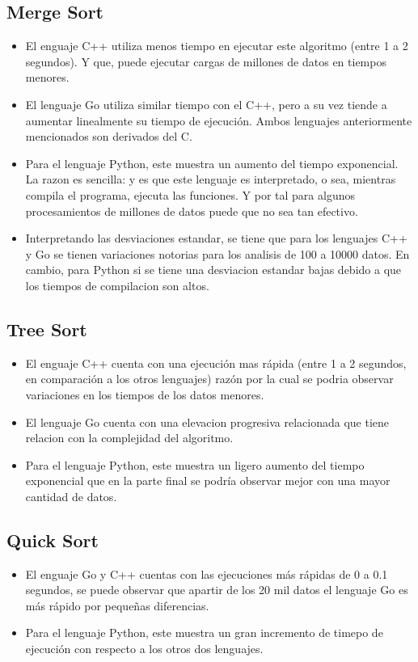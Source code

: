 \documentclass{article}
\begin{document}
    \subsection{Merge Sort} 
    \begin{itemize}
        \item El enguaje C++ utiliza menos tiempo en ejecutar este algoritmo (entre 1 a 2 segundos). Y que, puede ejecutar cargas de millones de datos en tiempos menores. 
        \item El lenguaje Go utiliza similar tiempo con el C++, pero a su vez tiende a aumentar linealmente su tiempo de ejecución. Ambos lenguajes anteriormente mencionados son derivados del C.
        \item Para el lenguaje Python, este muestra un aumento del tiempo exponencial. La razon es sencilla: y es que este lenguaje es interpretado, o sea, mientras compila el programa, ejecuta las funciones. Y por tal para algunos procesamientos de millones de datos puede que no sea tan efectivo.
        \item Interpretando las desviaciones estandar, se tiene que para los lenguajes C++ y Go se tienen variaciones notorias para los analisis de 100 a 10000 datos. En cambio, para Python si se tiene una desviacion estandar bajas debido a que los tiempos de compilacion son altos.
        
    \end{itemize}

    \subsection{Tree Sort}
	\begin{itemize}
        \item El enguaje C++ cuenta con una ejecución mas rápida (entre 1 a 2 segundos, en comparación a los otros lenguajes) razón por la cual se podria observar variaciones en los tiempos de los datos menores.
        \item El lenguaje Go cuenta con una elevacion progresiva relacionada que tiene relacion con la complejidad del algoritmo.
        \item Para el lenguaje Python, este muestra un ligero aumento del tiempo exponencial que en la parte final se podría observar mejor con una mayor cantidad de datos.        
    \end{itemize}

	
	\subsection{Quick Sort}
		\begin{itemize}
			\item El enguaje Go y C++ cuentas con las ejecuciones más rápidas de 0 a 0.1 segundos, se puede observar que apartir de los 20 mil datos el lenguaje Go es más rápido por pequeñas diferencias.
			\item Para el lenguaje Python, este muestra un gran incremento de timepo de ejecución con respecto a los otros dos lenguajes.        
		\end{itemize}
	
\end{document}
